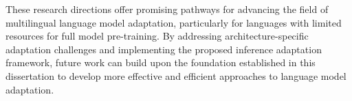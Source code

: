 These research directions offer promising pathways for advancing the field of multilingual language model adaptation, particularly for languages with limited resources for full model pre-training. By addressing architecture-specific adaptation challenges and implementing the proposed inference adaptation framework, future work can build upon the foundation established in this dissertation to develop more effective and efficient approaches to language model adaptation.
